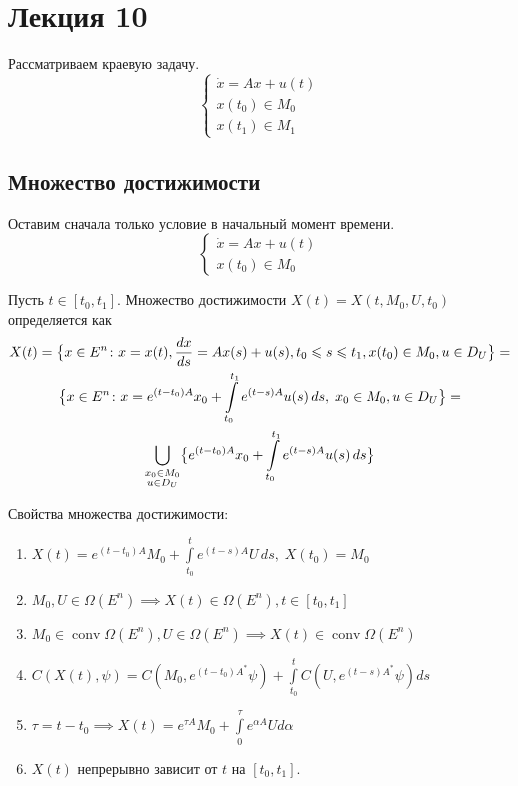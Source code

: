 \section{Лекция 10}

Рассматриваем краевую задачу.
\begin{equation*}
    \begin{cases}
        \dot{x} = Ax + u(t) \\
        x(t_0) \in M_0 \\
        x(t_1) \in M_1
    \end{cases}
\end{equation*}

\subsection{Множество достижимости}
Оставим сначала только условие в начальный момент времени.
\begin{equation*}
    \begin{cases}
        \dot{x} = Ax + u(t) \\
        x(t_0) \in M_0
    \end{cases}
\end{equation*}
\begin{defn}
    Пусть $t \in [t_0, t_1]$.
    Множество достижимости $X(t) = X(t, M_0, U, t_0)$ определяется как
    \begin{gather*}
        X(t) = \bigl\{ x \in E^n\colon x = x(t), \frac{dx}{ds} = Ax(s) + u(s), t_0 \leqslant s \leqslant t_1, x(t_0) \in M_0, u \in D_U \bigr\} = \\
        \bigl\{ x \in E^n\colon x = e^{(t - t_0)A} x_0 + \int\limits_{t_0}^{t_1} e^{(t - s)A} u(s) \, ds, \; x_0 \in M_0, u \in D_U \bigr\} = \\
        \bigcup_{\substack{ x_0 \in M_0 \\ u \in D_U}} \bigl\{ e^{(t - t_0)A} x_0 + \int\limits_{t_0}^{t_1} e^{(t - s)A} u(s) \,ds \bigr\}
    \end{gather*}
\end{defn}

Свойства множества достижимости:
\begin{enumerate}
    \item $X(t) = e^{(t - t_0)A} M_0 + \displaystyle \int\limits_{t_0}^{t} e^{(t - s)A}  U \, ds, \; X(t_0) = M_0$
    \item $M_0, U \in \Omega(E^n) \implies X(t) \in \Omega(E^n), t \in [t_0, t_1]$
    \item $M_0 \in \operatorname{conv}\Omega(E^n), U \in \Omega(E^n) \implies X(t) \in \operatorname{conv} \Omega(E^n)$
    \item $C(X(t), \psi) = C(M_0, e^{(t - t_0)A^*} \psi) + \displaystyle \int\limits_{t_0}^{t} C(U, e^{(t - s)A^*}\psi) ds$
    \item $\tau = t - t_0 \implies X(t) = e^{\tau A} M_0 + \displaystyle \int\limits_{0}^{\tau} e^{\alpha A} U d\alpha$
    \item $X(t)$ непрерывно зависит от $t$ на $[t_0, t_1]$.
\end{enumerate}

